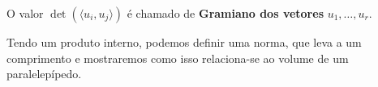\documentclass[../differential_forms.tex]{subfiles}
\begin{document}
\begin{tcolorbox}[
		skin=enhanced,
		title=Observação,
		fonttitle=\bfseries,
		colframe=black,
		colbacktitle=cyan!75!white,
		colback=cyan!15,
		colbacklower=black,
		coltitle=black,
		drop fuzzy shadow,
	]
	O valor \(\det{(\langle u_{i}, u_{j} \rangle)}\) é chamado de \textbf{Gramiano dos vetores} \(u_1, \dotsc , u_r\).
\end{tcolorbox}

Tendo um produto interno, podemos definir uma norma, que leva a um comprimento e mostraremos como isso relaciona-se ao volume de um paralelepípedo.
\end{document}
